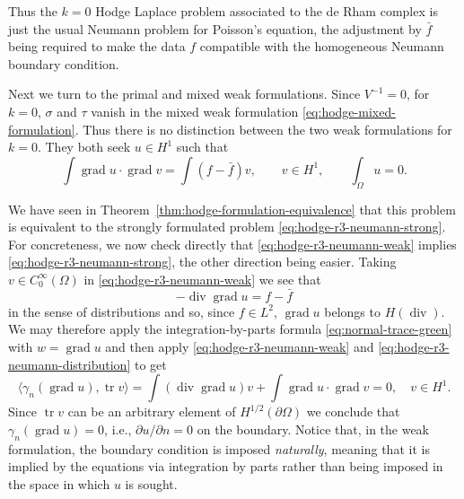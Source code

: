 {Thus the $k=0$ Hodge Laplace problem associated to the de Rham complex is just the usual Neumann problem for Poisson's equation, the adjustment by $\bar f$ being required to make the data $f$ compatible with the homogeneous Neumann boundary condition.}

{Next we turn to the primal and mixed weak formulations. Since $V^{-1}=0$, for $k=0$, $\sigma$ and $\tau$ vanish in the mixed weak formulation \eqref{eq:hodge-mixed-formulation}. Thus there is no distinction between the two weak formulations for $k=0$. They both seek $u\in H^1$ such that}
\begin{equation}\label{eq:hodge-r3-neumann-weak}
\int\operatorname{grad}u\cdot\operatorname{grad}v=\int(f-\bar f)v,\qquad v\in H^1,\qquad\int_\Omega u=0.
\end{equation}

{We have seen in Theorem~\ref{thm:hodge-formulation-equivalence} that this problem is equivalent to the strongly formulated problem \eqref{eq:hodge-r3-neumann-strong}. For concreteness, we now check directly that \eqref{eq:hodge-r3-neumann-weak} implies \eqref{eq:hodge-r3-neumann-strong}, the other direction being easier. Taking $v\in C_0^\infty(\Omega)$ in \eqref{eq:hodge-r3-neumann-weak} we see that}
\begin{equation}\label{eq:hodge-r3-neumann-distribution}
-\operatorname{div}\operatorname{grad}u=f-\bar f
\end{equation}
{in the sense of distributions and so, since $f\in L^2$, $\operatorname{grad}u$ belongs to $H(\operatorname{div})$. We may therefore apply the integration-by-parts formula \eqref{eq:normal-trace-green} with $w=\operatorname{grad}u$ and then apply \eqref{eq:hodge-r3-neumann-weak} and \eqref{eq:hodge-r3-neumann-distribution} to get}
\[
\langle\gamma_n(\operatorname{grad}u),\operatorname{tr}v\rangle=\int(\operatorname{div}\operatorname{grad}u)v+\int\operatorname{grad}u\cdot\operatorname{grad}v=0,\quad v\in H^1.
\]
{Since $\operatorname{tr}v$ can be an arbitrary element of $H^{1/2}(\partial\Omega)$ we conclude that $\gamma_n(\operatorname{grad}u)=0$, i.e., $\partial u/\partial n=0$ on the boundary. Notice that, in the weak formulation, the boundary condition is imposed \emph{naturally}, meaning that it is implied by the equations via integration by parts rather than being imposed in the space in which $u$ is sought.}

